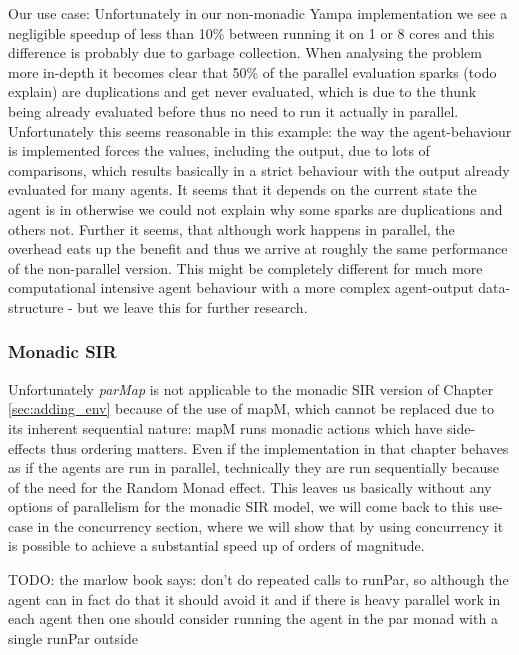 Our use case:
Unfortunately in our non-monadic Yampa implementation we see a negligible speedup of less than 10\% between running it on 1 or 8 cores and this difference is probably due to garbage collection. When analysing the problem more in-depth it becomes clear that 50\% of the parallel evaluation sparks (todo explain) are duplications and get never evaluated, which is due to the thunk being already evaluated before thus no need to run it actually in parallel. Unfortunately this seems reasonable in this example: the way the agent-behaviour is implemented forces the values, including the output, due to lots of comparisons, which results basically in a strict behaviour with the output already evaluated for many agents. It seems that it depends on the current state the agent is in otherwise we could not explain why some sparks are duplications and others not. Further it seems, that although work happens in parallel, the overhead eats up the benefit and thus we arrive at roughly the same performance of the non-parallel version. This might be completely different for much more computational intensive agent behaviour with a more complex agent-output data-structure - but we leave this for further research.

\subsubsection{Monadic SIR}
Unfortunately \textit{parMap} is not applicable to the monadic SIR version of Chapter \ref{sec:adding_env} because of the use of mapM, which cannot be replaced due to its inherent sequential nature: mapM runs monadic actions which have side-effects thus ordering matters. Even if the implementation in that chapter behaves as if the agents are run in parallel, technically they are run sequentially because of the need for the Random Monad effect. This leaves us basically without any options of parallelism for the monadic SIR model, we will come back to this use-case in the concurrency section, where we will show that by using concurrency it is possible to achieve a substantial speed up of orders of magnitude.

TODO: the marlow book says: don't do repeated calls to runPar, so although the agent can in fact do that it should avoid it and if there is heavy parallel work in each agent then one should consider running the agent in the par monad with a single runPar outside

